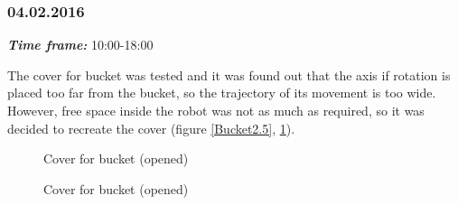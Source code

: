 \subsubsection{04.02.2016}
\textit{\textbf{Time frame:}} 10:00-18:00 

The cover for bucket was tested and it was found out that the axis if rotation is placed too far from the bucket, so the trajectory of its movement is too wide. However, free space inside the robot was not as much as required, so it was decided to recreate the cover (figure \ref{Bucket2.5}, \ref{Bucket2.6}).

\begin{figure}[H]
	\begin{minipage}[h]{0.47\linewidth}
		\caption{Cover for bucket (opened)}
		\label{Bucket2.5}
	\end{minipage}
	\hfill
	\begin{minipage}[h]{0.47\linewidth}
		\caption{Cover for bucket (opened)}
		\label{Bucket2.6}
	\end{minipage}
\end{figure}

